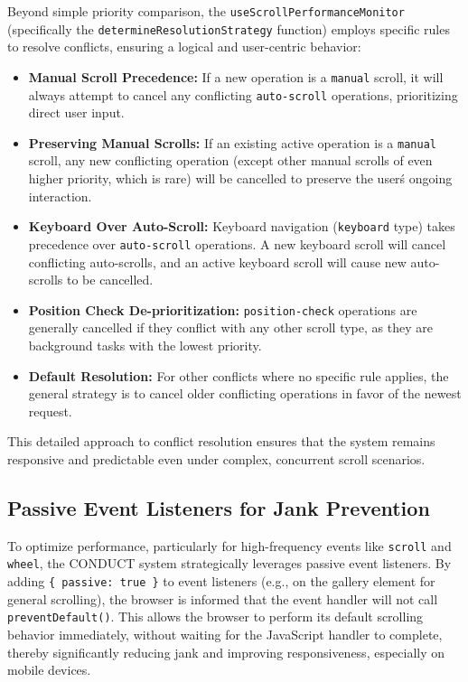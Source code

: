 \documentclass[10pt]{article}
\begin{document}
Beyond simple priority comparison, the \texttt{useScrollPerformanceMonitor} (specifically the \texttt{determineResolutionStrategy} function) employs specific rules to resolve conflicts, ensuring a logical and user-centric behavior:\n\begin{itemize}
    \item \textbf{Manual Scroll Precedence:} If a new operation is a \texttt{manual} scroll, it will always attempt to cancel any conflicting \texttt{auto-scroll} operations, prioritizing direct user input.
    \item \textbf{Preserving Manual Scrolls:} If an existing active operation is a \texttt{manual} scroll, any new conflicting operation (except other manual scrolls of even higher priority, which is rare) will be cancelled to preserve the user\'s ongoing interaction.
    \item \textbf{Keyboard Over Auto-Scroll:} Keyboard navigation (\texttt{keyboard} type) takes precedence over \texttt{auto-scroll} operations. A new keyboard scroll will cancel conflicting auto-scrolls, and an active keyboard scroll will cause new auto-scrolls to be cancelled.
    \item \textbf{Position Check De-prioritization:} \texttt{position-check} operations are generally cancelled if they conflict with any other scroll type, as they are background tasks with the lowest priority.
    \item \textbf{Default Resolution:} For other conflicts where no specific rule applies, the general strategy is to cancel older conflicting operations in favor of the newest request.
\end{itemize}
This detailed approach to conflict resolution ensures that the system remains responsive and predictable even under complex, concurrent scroll scenarios.

\subsection{Passive Event Listeners for Jank Prevention}

To optimize performance, particularly for high-frequency events like \texttt{scroll} and \texttt{wheel}, the CONDUCT system strategically leverages passive event listeners. By adding \texttt{\{ passive: true \}} to event listeners (e.g., on the gallery element for general scrolling), the browser is informed that the event handler will not call \texttt{preventDefault()}. This allows the browser to perform its default scrolling behavior immediately, without waiting for the JavaScript handler to complete, thereby significantly reducing jank and improving responsiveness, especially on mobile devices.
\end{document}
